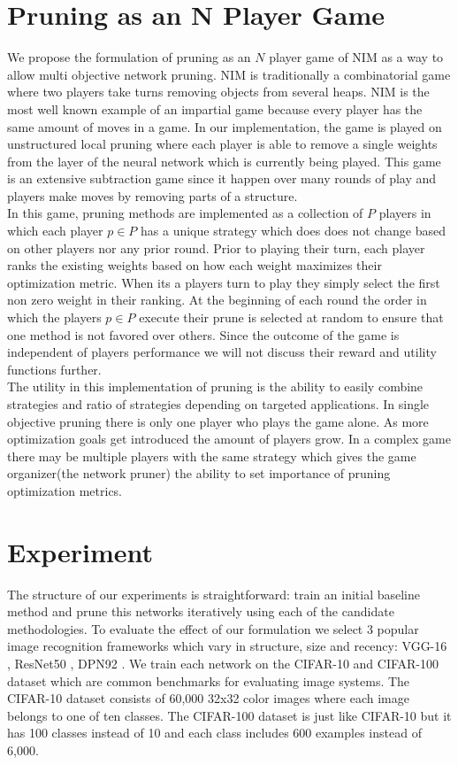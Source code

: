 \documentclass[runningheads]{llncs}
\begin{document}
\section{Pruning as an N Player Game}
We propose the formulation of pruning as an $N$ player game of NIM as a way to allow multi objective network pruning. NIM is traditionally a combinatorial game where two players take turns removing objects from several heaps. NIM is the most well known example of an impartial game because every player has the same amount of moves in a game. In our implementation, the game is played on unstructured local pruning where each player is able to remove a single weights from the layer of the neural network which is currently being played. This game is an extensive subtraction game since it happen over many rounds of play and players make moves by removing parts of a structure. \\
In this game, pruning methods are implemented as a collection of $P$ players in which each player $p \in P$ has a unique strategy which does does not change based on other players nor any prior round. Prior to playing their turn, each player ranks the existing weights based on how each weight maximizes their optimization metric. When its a players turn to play they simply select the first non zero weight in their ranking. At the beginning of each round the order in which the players $p \in P$ execute their prune is selected at random to ensure that one method is not favored over others.  Since the outcome of the game is independent of players performance we will not discuss their reward and utility functions further. \\
The utility in this implementation of pruning is the ability to easily combine strategies and ratio of strategies depending on targeted applications. In single objective pruning there is only one player who plays the game alone. As more optimization goals get introduced the amount of players grow. In a complex game there may be multiple players with the same strategy which gives the game organizer(the network pruner) the ability to set importance of pruning optimization metrics. 
\section{Experiment}
The structure of our experiments is straightforward: train an initial baseline method and prune this networks iteratively using each of the candidate methodologies. To evaluate the effect of our formulation we select 3 popular image recognition frameworks which vary in structure, size and recency: VGG-16 \cite{Simonyan2015VeryDC}, ResNet50 \cite{He2016DeepRL}, DPN92 \cite{Chen2017DualPN}. We train each network on the CIFAR-10 \cite{Krizhevsky2009LearningML} and CIFAR-100 \cite{CIFAR-10} dataset which are common benchmarks for evaluating image systems. The CIFAR-10 dataset consists of 60,000 32x32 color images where each image belongs to one of ten classes. The CIFAR-100 dataset is just like CIFAR-10 but it has 100 classes instead of 10 and each class includes 600 examples instead of 6,000.
\end{document}
